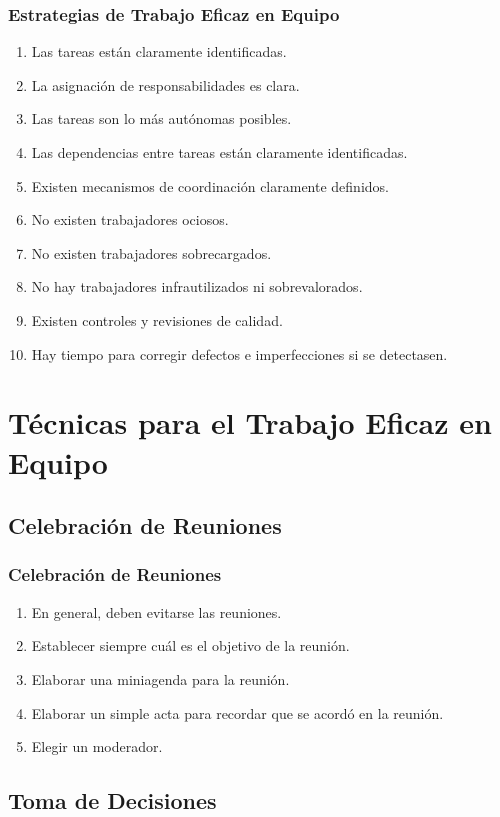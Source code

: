 \documentclass[a4paper,slidestop,xcolor=pst,dvips,blue]{beamer}
\begin{document}
\begin{frame}[c]
	\frametitle{Estrategias de Trabajo Eficaz en Equipo}
	\begin{enumerate}[<+->]
		\item Las tareas están claramente identificadas.
		\item La asignación de responsabilidades es clara.
		\item Las tareas son lo más autónomas posibles.
		\item Las dependencias entre tareas están claramente identificadas.
		\item Existen mecanismos de coordinación claramente definidos.
		\item No existen trabajadores ociosos.
		\item No existen trabajadores sobrecargados.
		\item No hay trabajadores infrautilizados ni sobrevalorados.
		\item Existen controles y revisiones de calidad.
		\item Hay tiempo para corregir defectos e imperfecciones si se detectasen.
	\end{enumerate}
\end{frame}

\section{Técnicas para el Trabajo Eficaz en Equipo}

\subsection{Celebración de Reuniones}

\begin{frame}[c]
	\frametitle{Celebración de Reuniones}
	\begin{enumerate}[<+->]
		\item En general, deben evitarse las reuniones.
		\item Establecer siempre cuál es el objetivo de la reunión.
		\item Elaborar una miniagenda para la reunión.
		\item Elaborar un simple acta para recordar que se acordó en la reunión.
		\item Elegir un moderador.
	\end{enumerate}
\end{frame}

\subsection{Toma de Decisiones}
\end{document}
